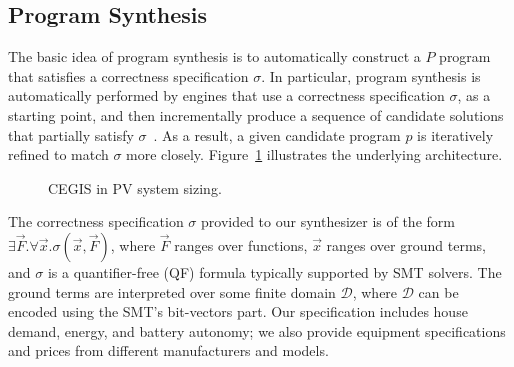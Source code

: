 \documentclass[runningheads]{llncs}
\begin{document}
\subsection{Program Synthesis}
\label{sec:ProgramSynthesis}
The basic idea of program synthesis is to automatically construct a $ P $ program that satisfies a correctness specification $\sigma$. In particular, program synthesis is automatically performed by engines that use a correctness specification $\sigma$, as a starting point, and then incrementally produce a sequence of candidate solutions that partially satisfy $\sigma$~\cite{Abateetal2017}. As a result, a given candidate program $p$ is iteratively refined to match $\sigma$ more closely. Figure~\ref{Counter-Example-Guided-Inductive-Synthesis} illustrates the underlying architecture. 
%
\begin{figure}[h]
\begin{center}
\end{center}
	\caption{CEGIS in PV system sizing.}
	\label{Counter-Example-Guided-Inductive-Synthesis}
\end{figure}

The correctness specification $\sigma$ provided to our synthesizer is of the form $\exists \vec{F}. \forall \vec{x}. \sigma(\vec{x}, \vec{F})$, where $\vec{F}$ ranges over functions, $\vec{x}$ ranges over ground terms, and $\sigma$ is a quantifier-free (QF) formula typically supported by SMT solvers. The ground terms are interpreted over some finite domain $\mathcal{D}$, where $\mathcal{D}$ can be encoded using the SMT's bit-vectors part. Our specification includes house demand, energy, and battery autonomy; we also provide equipment specifications and prices from different manufacturers and models.
\end{document}
